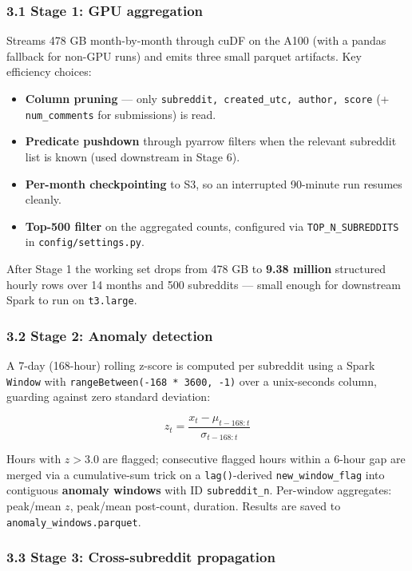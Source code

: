\documentclass[
]{article}
\begin{document}
\subsubsection{3.1 Stage 1: GPU aggregation}

Streams 478 GB month-by-month through cuDF on the A100 (with a pandas
fallback for non-GPU runs) and emits three small parquet artifacts. Key
efficiency choices:

\begin{itemize}
\item
  \textbf{Column pruning} --- only
  \texttt{subreddit,\ created\_utc,\ author,\ score} (+
  \texttt{num\_comments} for submissions) is read.
\item
  \textbf{Predicate pushdown} through pyarrow filters when the relevant
  subreddit list is known (used downstream in Stage 6).
\item
  \textbf{Per-month checkpointing} to S3, so an interrupted 90-minute
  run resumes cleanly.
\item
  \textbf{Top-500 filter} on the aggregated counts, configured via
  \texttt{TOP\_N\_SUBREDDITS} in \texttt{config/settings.py}.
\end{itemize}

After Stage 1 the working set drops from 478 GB to \textbf{9.38 million}
structured hourly rows over 14 months and 500 subreddits --- small
enough for downstream Spark to run on \texttt{t3.large}.

\subsubsection{3.2 Stage 2: Anomaly detection }

A 7-day (168-hour) rolling z-score is computed per subreddit using a
Spark \texttt{Window} with \texttt{rangeBetween(-168\ *\ 3600,\ -1)}
over a unix-seconds column, guarding against zero standard deviation:

\[
z_t = \frac{x_t - \mu_{t-168:t}}{\sigma_{t-168:t}}
\]

Hours with $z > 3.0$ are flagged; consecutive flagged hours within a
6-hour gap are merged via a cumulative-sum trick on a
\texttt{lag()}-derived \texttt{new\_\allowbreak window\_\allowbreak flag}
into contiguous \textbf{anomaly windows} with ID
\texttt{subreddit\_\allowbreak n}. Per-window aggregates: peak/mean $z$,
peak/mean post-count, duration. Results are saved to
\texttt{anomaly\_\allowbreak windows.parquet}.

\subsubsection{3.3 Stage 3: Cross-subreddit propagation}
\end{document}
